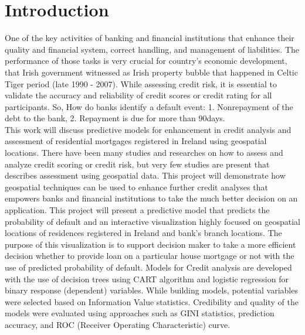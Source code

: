%
%
%
%

\chapter{Introduction}\label{C.intro}
One of the key activities of banking and financial institutions that enhance their quality and financial system, correct handling, and management of liabilities. The performance of those tasks is very crucial for country's economic development, that Irish government witnessed as Irish property bubble that happened in Celtic Tiger period (late 1990 - 2007). While assessing credit risk, it is essential to validate the accuracy and reliability of credit scores or credit rating for all participants. So, How do banks identify a default event: 1. Nonrepayment of the debt to the bank, 2. Repayment is due for more than 90days.\\

This work will discuss predictive models for enhancement in credit analysis and assessment of residential mortgages registered in Ireland using geospatial locations. There have been many studies and researches on how to assess and analyze credit scoring or credit risk, but very few studies are present that describes assessment using geospatial data. This project will demonstrate how geospatial techniques can be used to enhance further credit analyses that empowers banks and financial institutions to take the much better decision on an application. This project will present a predictive model that predicts the probability of default and an interactive visualization highly focused on geospatial locations of residences registered in Ireland and bank's branch locations. The purpose of this visualization is to support decision maker to take a more efficient decision whether to provide loan on a particular house mortgage or not with the use of predicted probability of default. Models for Credit analysis are developed with the use of decision trees using CART algorithm and logistic regression for binary response (dependent) variables. While building models, potential variables were selected based on Information Value statistics. Credibility and quality of the models were evaluated using approaches such as GINI statistics, prediction accuracy, and ROC (Receiver Operating Characteristic) curve.\\

